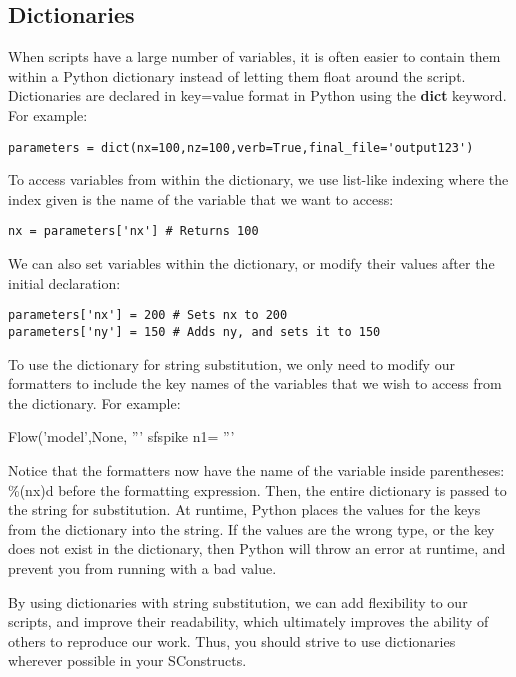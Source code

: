 \subsection{Dictionaries}

When scripts have a large number of variables, it is often easier to contain them within a Python dictionary instead of letting them float around the script.  Dictionaries are declared in key=value format in Python using the \textbf{dict} keyword.  For example:

\begin{verbatim}
parameters = dict(nx=100,nz=100,verb=True,final_file='output123')
\end{verbatim}

To access variables from within the dictionary, we use list-like indexing where the index given is the name of the variable that we want to access:

\begin{verbatim}
nx = parameters['nx'] # Returns 100
\end{verbatim}

We can also set variables within the dictionary, or modify their values after the initial declaration:

\begin{verbatim}
parameters['nx'] = 200 # Sets nx to 200
parameters['ny'] = 150 # Adds ny, and sets it to 150
\end{verbatim}

To use the dictionary for string substitution, we only need to modify our formatters to include the key names of the variables that we wish to access from the dictionary.  For example:

\begin{verbatimtab}[4]
Flow('model',None,
	'''
	sfspike n1=%
	''' %
\end{verbatimtab}
Notice that the formatters now have the name of the variable inside parentheses: \%(nx)d before the formatting expression.  Then, the entire dictionary is passed to the string for substitution.  At runtime, Python places the values for the keys from the dictionary into the string.  If the values are the wrong type, or the key does not exist in the dictionary, then Python will throw an error at runtime, and prevent you from running with a bad value.

By using dictionaries with string substitution, we can add flexibility to our scripts, and improve their readability, which ultimately improves the ability of others to reproduce our work.  Thus, you should strive to use dictionaries wherever possible in your SConstructs.

